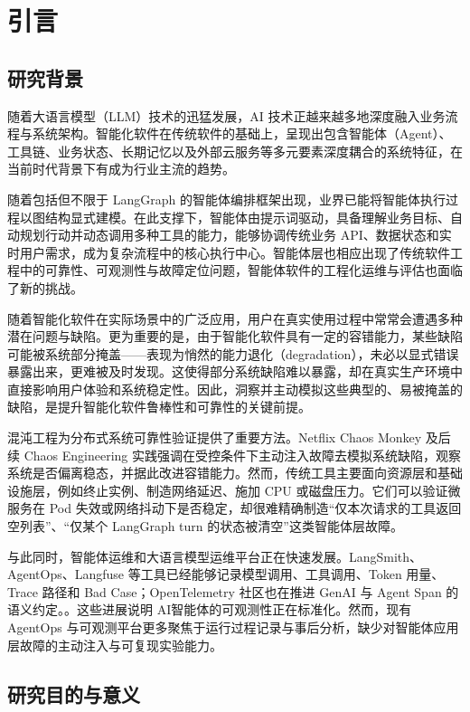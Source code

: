 \chapter{引言}

\section{研究背景}

随着大语言模型（LLM）技术的迅猛发展，AI 技术正越来越多地深度融入业务流程与系统架构。智能化软件在传统软件的基础上，呈现出包含智能体（Agent）、工具链、业务状态、长期记忆以及外部云服务等多元要素深度耦合的系统特征，在当前时代背景下有成为行业主流的趋势。

随着包括但不限于 LangGraph 的智能体编排框架出现，业界已能将智能体执行过程以图结构显式建模。在此支撑下，智能体由提示词驱动，具备理解业务目标、自动规划行动并动态调用多种工具的能力，能够协调传统业务 API、数据状态和实时用户需求，成为复杂流程中的核心执行中心。智能体层也相应出现了传统软件工程中的可靠性、可观测性与故障定位问题，智能体软件的工程化运维与评估也面临了新的挑战。

随着智能化软件在实际场景中的广泛应用，用户在真实使用过程中常常会遭遇多种潜在问题与缺陷。更为重要的是，由于智能化软件具有一定的容错能力，某些缺陷可能被系统部分掩盖——表现为悄然的能力退化（degradation），未必以显式错误暴露出来，更难被及时发现。这使得部分系统缺陷难以暴露，却在真实生产环境中直接影响用户体验和系统稳定性。因此，洞察并主动模拟这些典型的、易被掩盖的缺陷，是提升智能化软件鲁棒性和可靠性的关键前提。

混沌工程为分布式系统可靠性验证提供了重要方法。Netflix Chaos Monkey 及后续 Chaos Engineering 实践强调在受控条件下主动注入故障去模拟系统缺陷，观察系统是否偏离稳态，并据此改进容错能力\cite{basiri2016chaos,netflixChaosMonkey}。然而，传统工具主要面向资源层和基础设施层，例如终止实例、制造网络延迟、施加 CPU 或磁盘压力。它们可以验证微服务在 Pod 失效或网络抖动下是否稳定，却很难精确制造“仅本次请求的工具返回空列表”、“仅某个 LangGraph turn 的状态被清空”这类智能体层故障。

与此同时，智能体运维和大语言模型运维平台正在快速发展。LangSmith、AgentOps、Langfuse 等工具已经能够记录模型调用、工具调用、Token 用量、Trace 路径和 Bad Case；OpenTelemetry 社区也在推进 GenAI 与 Agent Span 的语义约定。\cite{otelAgentObservability,otelGenAIAgentSpans,otelGenAIMetrics}。这些进展说明 AI智能体的可观测性正在标准化。然而，现有 AgentOps 与可观测平台更多聚焦于运行过程记录与事后分析，缺少对智能体应用层故障的主动注入与可复现实验能力。

\section{研究目的与意义}

